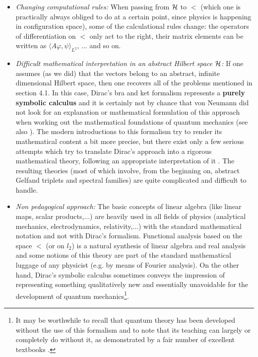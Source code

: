 \documentclass[a4wide,12pt]{report}
\begin{document}
\begin{itemize}
\item
{\em Changing computational rules:}
When passing from ${\cal H}$ to $\lt$
(which one is practically always obliged to do at a certain point, 
since physics is happening in configuration space), 
some of the calculational rules change: the operators 
of differentiation on $\lt$ only act to the right, 
their matrix elements can be written as 
$\langle A \varphi , \psi \rangle _{L^2}$, ... and so on. 
 
\item {\em Difficult mathematical interpretation in an abstract 
Hilbert space ${\cal H}$:}
If one assumes (as we did) that the vectors belong to 
an abstract, infinite dimensional Hilbert space, 
then one recovers all of the problems mentioned 
in section 4.1. 
In this case, Dirac's bra and ket formalism represents a 
{\bf purely symbolic calculus} and it is certainly not 
by chance that von Neumann did not look for an explanation 
or mathematical formulation of this approach 
when working out the mathematical foundations of quantum mechanics
\cite{jvn} (see also \cite{stone}). 
The modern introductions to this formalism 
try to render its mathematical content a bit more precise, 
but there exist only a few serious attempts which try to 
translate Dirac's approach into a rigorous mathematical theory, 
following an appropriate interpretation of it 
\cite{jr,jpa,ein,gl,jau}.
The resulting theories (most of which involve,  
from the beginning on,  
abstract Gelfand triplets and spectral families) 
are quite complicated and difficult to handle. 
 
\item
{\em Non pedagogical approach:}
The basic concepts of linear algebra (like linear maps, 
scalar products,...) are heavily used in all fields of physics 
(analytical mechanics, electrodynamics, relativity,...) 
with the standard mathematical notation and not with Dirac's 
formalism. Functional analysis based on the space 
$\lt$ (or on $l_2$) is a natural synthesis of linear algebra 
and real analysis and some notions of this theory are part
of the standard mathematical luggage of any physicist
(e.g. by means of Fourier analysis). 
On the other hand, Dirac's symbolic calculus sometimes conveys  
the impression of representing something qualitatively new 
and essentially unavoidable for the development of quantum 
mechanics\footnote{It may be worthwhile to recall that quantum 
theory has been developed without the use of this formalism 
\cite{vdw} and to note that its teaching can largely or 
completely do without it, as demonstrated by a fair number of excellent 
textbooks \cite{gap,ll,pd}.}.
\end{itemize}
\end{document}
